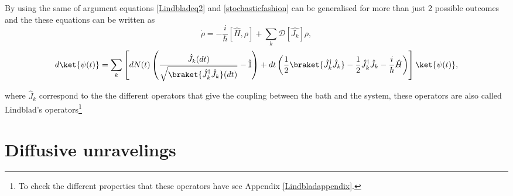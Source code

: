 By using the same  of argument equations \eqref{Lindbladeq2} and \eqref{stochasticfashion} can be generalised for more than just 2 possible outcomes and the these equations can be written as
\begin{equation}
\dot{\rho}=-\frac{i}{\hbar}[\hat{H},\rho]+\sum_{k}\mathcal{D}[\hat{J_{k}}]\rho,
\label{GeneralLindblad}
\end{equation}
\begin{equation}
d\ket{\psi(t)}=\sum_{k}\left[dN(t)\left(\frac{\hat{J}_{k}(dt)}{\sqrt{\braket{\hat{J}_{k}^{\dagger}\hat{J}_{k}}(dt)}}-\hat{\mathbb{I}}\right)+dt\left(\frac{1}{2}\braket{\hat{J}_{k}^{\dagger}\hat{J}_{k}}-\frac{1}{2}\hat{J}_{k}^{\dagger}\hat{J}_{k}-\frac{i}{\hbar}\hat{H}\right)\right]\ket{\psi(t)} ,
\label{Generaltrajectory}
\end{equation}
 
where $\hat{J}_{k}$ correspond to the the different operators that give the coupling between the bath and the system, these operators are also called Lindblad's operators\footnote{To check the different properties that these operators have see Appendix \ref{Lindbladappendix}.} \\


\section{Diffusive unravelings}

